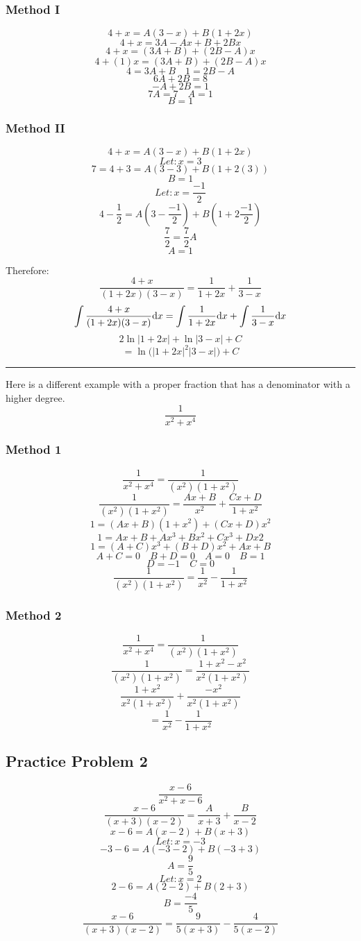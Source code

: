 \documentclass{math}
\begin{document}
\subsubsection*{Method I}
\[ 4+x = A(3-x)+B(1+2x) \]
\[ 4+x = 3A-Ax+B+2Bx \]
\[ 4+x = (3A+B)+(2B-A)x \]
\[ 4+(1)x = (3A+B)+(2B-A)x \]
\[ 4 = 3A+B \quad 1 = 2B-A \]
\[ 6A+2B = 8 \]
\[ -A+2B = 1 \]
\[ 7A = 7 \quad A = 1 \]
\[ B = 1 \]

\subsubsection*{Method II}
\[ 4+x = A(3-x)+B(1+2x) \]
\[ Let: x = 3 \]
\[ 7 = 4+3 = A(3-3)+B(1+2(3)) \]
\[ B = 1 \]
\[ Let: x = \frac{-1}{2} \]
\[ 4-\frac{1}{2} = A(3-\frac{-1}{2})+B(1+2\frac{-1}{2}) \]
\[ \frac{7}{2} = \frac{7}{2}A \]
\[ A = 1 \]

Therefore:
\[ \frac{4+x}{(1+2x)(3-x)} = \frac{1}{1+2x}+\frac{1}{3-x} \]
\[ \int{\frac{4+x}{(1+2x)(3-x)}\mathrm{d}{x}} =
   \int{\frac{1}{1+2x}\mathrm{d}{x}}+\int{\frac{1}{3-x}\mathrm{d}{x}} \]
\[ 2\ln|1+2x|+\ln|3-x|+C \]
\[ = \ln\bigg(|1+2x|^{2}|3-x|\bigg)+C \]

\noindent\rule{13.7cm}{0.4pt}

Here is a different example with a proper fraction that has a denominator
with a higher degree.
\[ \frac{1}{x^{2}+x^{4}} \]

\subsubsection*{Method 1}
\[ \frac{1}{x^{2}+x^{4}} = \frac{1}{(x^{2})(1+x^{2})} \]
\[ \frac{1}{(x^{2})(1+x^{2})} = \frac{Ax+B}{x^{2}}+\frac{Cx+D}{1+x^{2}} \]
\[ 1 = (Ax+B)(1+x^{2})+(Cx+D)x^{2} \]
\[ 1 = Ax+B+Ax^{3}+Bx^{2}+Cx^{3}+Dx{2} \]
\[ 1 = (A+C)x^{3}+(B+D)x^{2}+Ax+B \]
\[ A+C = 0 \quad B+D = 0 \quad A = 0 \quad B = 1 \]
\[ D = -1 \quad C = 0 \]
\[ \frac{1}{(x^{2})(1+x^{2})} = \frac{1}{x^{2}}-\frac{1}{1+x^{2}} \]

\subsubsection*{Method 2}
\[ \frac{1}{x^{2}+x^{4}} = \frac{1}{(x^{2})(1+x^{2})} \]
\[ \frac{1}{(x^{2})(1+x^{2})} = \frac{1+x^{2}-x^{2}}{x^{2}(1+x^{2})} \]
\[ \frac{1+x^{2}}{x^{2}(1+x^{2})}+\frac{-x^{2}}{x^{2}(1+x^{2})} \]
\[ = \frac{1}{x^{2}}-\frac{1}{1+x^{2}} \]

\subsection*{Practice Problem 2}
\[ \frac{x-6}{x^{2}+x-6} \]
\[ \frac{x-6}{(x+3)(x-2)} = \frac{A}{x+3}+\frac{B}{x-2} \]
\[ x-6 = A(x-2)+B(x+3) \]
\[ Let: x = -3 \]
\[ -3-6 = A(-3-2)+B(-3+3) \]
\[ A = \frac{9}{5} \]
\[ Let: x = 2 \]
\[ 2-6 = A(2-2)+B(2+3) \]
\[ B = \frac{-4}{5} \]
\[ \frac{x-6}{(x+3)(x-2)} = \frac{9}{5(x+3)}-\frac{4}{5(x-2)} \]
\end{document}
